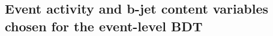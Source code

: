 

\subsection{Event activity and b-jet content variables chosen for the event-level BDT}
\label{sec:eventActivity}

